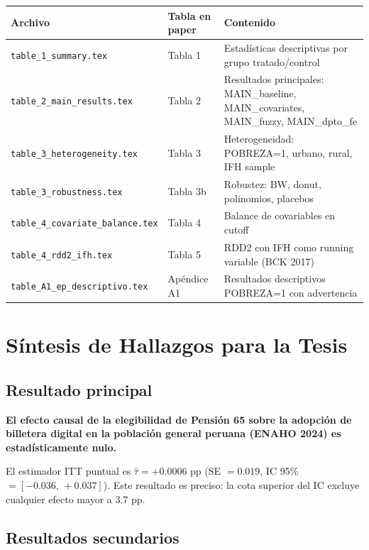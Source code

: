 \documentclass[12pt, a4paper]{article}
\begin{document}
\begin{center}
\begin{tabular}{llp{7cm}}
\toprule
Archivo & Tabla en paper & Contenido \\\midrule
\texttt{table\_1\_summary.tex} & Tabla 1 & Estadísticas descriptivas por grupo tratado/control \\
\texttt{table\_2\_main\_results.tex} & Tabla 2 & Resultados principales: MAIN\_baseline, MAIN\_covariates, MAIN\_fuzzy, MAIN\_dpto\_fe \\
\texttt{table\_3\_heterogeneity.tex} & Tabla 3 & Heterogeneidad: POBREZA=1, urbano, rural, IFH sample \\
\texttt{table\_3\_robustness.tex} & Tabla 3b & Robustez: BW, donut, polinomios, placebos \\
\texttt{table\_4\_covariate\_balance.tex} & Tabla 4 & Balance de covariables en cutoff \\
\texttt{table\_4\_rdd2\_ifh.tex} & Tabla 5 & RDD2 con IFH como running variable (BCK 2017) \\
\texttt{table\_A1\_ep\_descriptivo.tex} & Apéndice A1 & Resultados descriptivos POBREZA=1 con advertencia \\
\bottomrule
\end{tabular}
\end{center}

\section{Síntesis de Hallazgos para la Tesis}

\subsection{Resultado principal}

\textbf{El efecto causal de la elegibilidad de Pensión 65 sobre la adopción
de billetera digital en la población general peruana (ENAHO 2024) es
estadísticamente nulo.}

El estimador ITT puntual es $\hat{\tau} = +0.0006$ pp (SE $= 0.019$,
IC 95\% $= [-0.036,\, +0.037]$). Este resultado es preciso: la cota
superior del IC excluye cualquier efecto mayor a 3.7 pp.

\subsection{Resultados secundarios}
\end{document}

